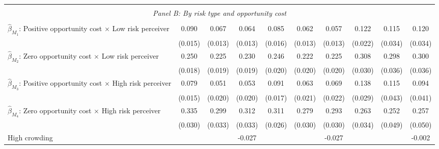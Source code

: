 \begin{tabular}{l*{9}{c}}
\hline \\[-1ex] \multicolumn{10}{c}{\textit{Panel B: By risk type and opportunity cost}} \\\\[-1ex]
$\hat\beta_{M_1}$: Positive opportunity cost $\times$ Low risk perceiver&       0.090\sym{***}&       0.067\sym{***}&       0.064\sym{***}&       0.085\sym{***}&       0.062\sym{***}&       0.057\sym{***}&       0.122\sym{***}&       0.115\sym{***}&       0.120\sym{***}\\
                    &     (0.015)         &     (0.013)         &     (0.013)         &     (0.016)         &     (0.013)         &     (0.013)         &     (0.022)         &     (0.034)         &     (0.034)         \\
[1em]
$\hat\beta_{M_2}$: Zero opportunity cost $\times$ Low risk perceiver&       0.250\sym{***}&       0.225\sym{***}&       0.230\sym{***}&       0.246\sym{***}&       0.222\sym{***}&       0.225\sym{***}&       0.308\sym{***}&       0.298\sym{***}&       0.300\sym{***}\\
                    &     (0.018)         &     (0.019)         &     (0.019)         &     (0.020)         &     (0.020)         &     (0.020)         &     (0.030)         &     (0.036)         &     (0.036)         \\
[1em]
$\hat\beta_{M_3}$: Positive opportunity cost $\times$ High risk perceiver&       0.079\sym{***}&       0.051\sym{**} &       0.053\sym{***}&       0.091\sym{***}&       0.063\sym{***}&       0.069\sym{***}&       0.138\sym{***}&       0.115\sym{***}&       0.094\sym{**} \\
                    &     (0.015)         &     (0.020)         &     (0.020)         &     (0.017)         &     (0.021)         &     (0.022)         &     (0.029)         &     (0.043)         &     (0.041)         \\
[1em]
$\hat\beta_{M_4}$: Zero opportunity cost $\times$ High risk perceiver&       0.335\sym{***}&       0.299\sym{***}&       0.312\sym{***}&       0.311\sym{***}&       0.279\sym{***}&       0.293\sym{***}&       0.263\sym{***}&       0.252\sym{***}&       0.257\sym{***}\\
                    &     (0.030)         &     (0.033)         &     (0.033)         &     (0.026)         &     (0.030)         &     (0.030)         &     (0.034)         &     (0.049)         &     (0.050)         \\
[1em]
High crowding       &                     &                     &      -0.027         &                     &                     &      -0.027         &                     &                     &      -0.002         \\

\end{tabular}

